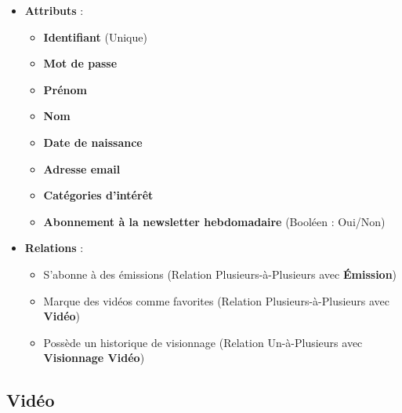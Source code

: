 \documentclass{article}
\begin{document}
\begin{itemize}
    \item \textbf{Attributs} :
    \begin{itemize}
        \item \textbf{Identifiant} (Unique)
        \item \textbf{Mot de passe}
        \item \textbf{Prénom}
        \item \textbf{Nom}
        \item \textbf{Date de naissance}
        \item \textbf{Adresse email}
        \item \textbf{Catégories d'intérêt}
        \item \textbf{Abonnement à la newsletter hebdomadaire} (Booléen : Oui/Non)
    \end{itemize}
    \item \textbf{Relations} :
    \begin{itemize}
        \item S'abonne à des émissions (Relation Plusieurs-à-Plusieurs avec \textbf{Émission})
        \item Marque des vidéos comme favorites (Relation Plusieurs-à-Plusieurs avec \textbf{Vidéo})
        \item Possède un historique de visionnage (Relation Un-à-Plusieurs avec \textbf{Visionnage Vidéo})
    \end{itemize}
\end{itemize}

\subsection{Vidéo}
\end{document}
